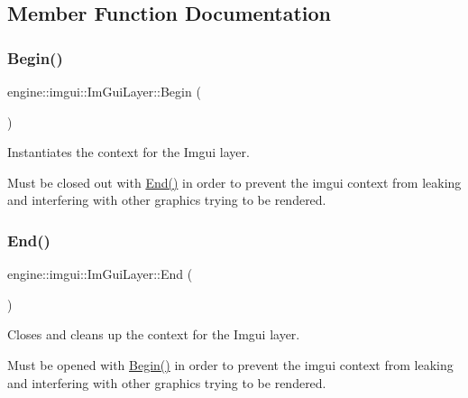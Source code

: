 \subsection{Member Function Documentation}
\mbox{\label{classengine_1_1imgui_1_1ImGuiLayer_aaecbd780bfe93ea0b85c9b31c3a931de}} 
\subsubsection{\texorpdfstring{Begin()}{Begin()}}
{\footnotesize\ttfamily engine\+::imgui\+::\+Im\+Gui\+Layer\+::\+Begin (\begin{DoxyParamCaption}{ }\end{DoxyParamCaption})}



Instantiates the context for the Imgui layer. 

Must be closed out with \hyperlink{classengine_1_1imgui_1_1ImGuiLayer_aca4c57dc3361ed5c4c75a9c43b8dc1e6}{End()} in order to prevent the imgui context from leaking and interfering with other graphics trying to be rendered. \mbox{\label{classengine_1_1imgui_1_1ImGuiLayer_aca4c57dc3361ed5c4c75a9c43b8dc1e6}} 
\subsubsection{\texorpdfstring{End()}{End()}}
{\footnotesize\ttfamily engine\+::imgui\+::\+Im\+Gui\+Layer\+::\+End (\begin{DoxyParamCaption}{ }\end{DoxyParamCaption})}



Closes and cleans up the context for the Imgui layer. 

Must be opened with \hyperlink{classengine_1_1imgui_1_1ImGuiLayer_aaecbd780bfe93ea0b85c9b31c3a931de}{Begin()} in order to prevent the imgui context from leaking and interfering with other graphics trying to be rendered. \mbox{\label{classengine_1_1imgui_1_1ImGuiLayer_a8580bd31942d4bc33f268053d2adec31}} 
